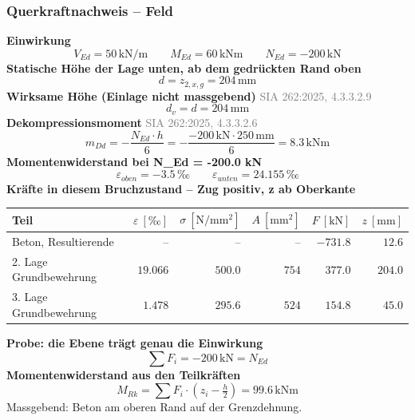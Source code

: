 \documentclass[11pt,a4paper]{article}
\newcommand{\normref}[1]{{\small\textcolor{gray}{#1}}}
\begin{document}
\subsubsection{Querkraftnachweis – Feld}
\noindent\textbf{Einwirkung}
\begin{equation*}
V_{Ed} = 50\,\mathrm{kN}/\mathrm{m} \qquad M_{Ed} = 60\,\mathrm{kNm} \qquad N_{Ed} = -200\,\mathrm{kN}
\end{equation*}
\noindent\textbf{Statische Höhe der Lage unten, ab dem gedrückten Rand oben}
\begin{equation*}
d = z_{2,x,g} = 204\,\mathrm{mm}
\end{equation*}
\noindent\textbf{Wirksame Höhe (Einlage nicht massgebend)} \hfill \normref{SIA 262:2025, 4.3.3.2.9}
\begin{equation*}
d_v = d = 204\,\mathrm{mm}
\end{equation*}
\noindent\textbf{Dekompressionsmoment} \hfill \normref{SIA 262:2025, 4.3.3.2.6}
\begin{equation*}
m_{Dd} = -\frac{N_{Ed} \cdot h}{6} = -\frac{-200\,\mathrm{kN} \cdot 250\,\mathrm{mm}}{6} = 8.3\,\mathrm{kNm}
\end{equation*}
\noindent\textbf{Momentenwiderstand bei N\_Ed = -200.0 kN}
\begin{equation*}
\varepsilon_{oben} = -3.5\,\text{‰} \qquad \varepsilon_{unten} = 24.155\,\text{‰}
\end{equation*}
\noindent\textbf{Kräfte in diesem Bruchzustand – Zug positiv, z ab Oberkante}
\begin{longtable}{lrrrrr}
\hline
Teil & $\varepsilon\ [‰]$ & $\sigma\ [\mathrm{N/mm^2}]$ & $A\ [\mathrm{mm}^2]$ & $F\ [\mathrm{kN}]$ & $z\ [\mathrm{mm}]$ \\
\hline
\endhead
Beton, Resultierende & $–$ & $–$ & $–$ & $-731.8$ & $12.6$ \\
2. Lage Grundbewehrung & $19.066$ & $500.0$ & $754$ & $377.0$ & $204.0$ \\
3. Lage Grundbewehrung & $1.478$ & $295.6$ & $524$ & $154.8$ & $45.0$ \\
\hline
\end{longtable}
\noindent\textbf{Probe: die Ebene trägt genau die Einwirkung}
\begin{equation*}
\sum F_i = -200\,\mathrm{kN} = N_{Ed}
\end{equation*}
\noindent\textbf{Momentenwiderstand aus den Teilkräften}
\begin{equation*}
M_{Rk} = \sum F_i \cdot \left(z_i - \tfrac{h}{2}\right) = 99.6\,\mathrm{kNm}
\end{equation*}
Massgebend: Beton am oberen Rand auf der Grenzdehnung.
\end{document}

